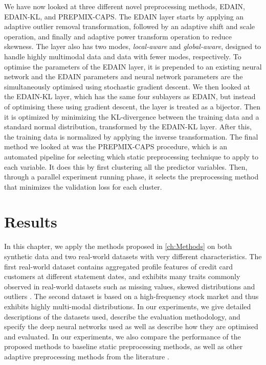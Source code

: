 \documentclass{statsmsc}
\begin{document}
{We have now looked at three different novel preprocessing methods,
\ac{EDAIN}, \ac{EDAIN-KL}, and \ac{PREPMIX-CAPS}. The \ac{EDAIN} layer starts by applying
an adaptive outlier removal transformation, followed by an adaptive shift and scale operation,
and finally and adaptive power transform operation to reduce skewness. The layer also has
two modes, \textit{local-aware} and \textit{global-aware}, designed to handle highly
multimodal data and data with fewer modes, respectively. To optimise the parameters of
the \ac{EDAIN} layer, it is prepended to an existing neural network and the
\ac{EDAIN} parameters and neural network parameters are the simultaneously optimised using
stochastic gradient descent. We then looked at the \ac{EDAIN-KL} layer, which has the same
four sublayers as \ac{EDAIN}, but instead of optimising these using gradient descent, the layer
is treated as a bijector. Then it is optimized by minimizing the \ac{KL-divergence} between the
training data and a standard  normal distribution, transformed by the \ac{EDAIN-KL} layer.
After this, the training data is normalized by applying the inverse transformation.
The final method we looked at was the \ac{PREPMIX-CAPS} procedure, which is an automated
pipeline for selecting which static preprocessing technique to apply to each variable. It does this
by first clustering all the predictor variables. Then, through a parallel experiment
running phase, it selects the preprocessing method that minimizes the validation loss for each
cluster.


\chapter{Results} %
\label{ch:Results}


In this chapter, we apply the methods proposed in \cref{ch:Methods} on both
synthetic data and two real-world datasets with very different characteristics.
The first real-world dataset contains
aggregated profile features of credit card customers at different statement
dates, and exhibits many traits commonly observed in
real-world datasets such as missing values, skewed distributions and outliers
\citep{nawi,brits}.
The second dataset is based on a high-frequency stock market and thus
exhibits highly multi-modal distributions.
In our experiments, we give detailed descriptions of the
datasets used, describe the evaluation methodology, and specify the deep neural
networks used as well as describe how they are optimised and evaluated. In our
experiments, we also compare the performance of the proposed methods to
baseline static preprocessing methods, as well as other adaptive preprocessing
methods from the literature \citep{dain,bin}.

}
\end{document}
